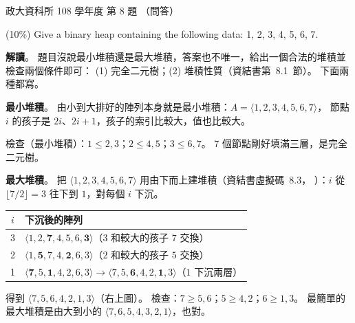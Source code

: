 \begin{pastexam}[label={px:nccu-108-dsa-08}]{政大資科所 108 學年度 第 8 題}
（問答）

(10\%) Give a binary heap containing the following data: 1, 2, 3, 4, 5, 6, 7.
\end{pastexam}

\begin{pastsoln}
\textbf{解讀}。 題目沒說最小堆積還是最大堆積，答案也不唯一，給出一個合法的堆積並檢查兩個條件即可：
(1) 完全二元樹；(2) 堆積性質（資結書第~8.1~節）。 下面兩種都寫。

\textbf{最小堆積}。 由小到大排好的陣列本身就是最小堆積：$A = \langle 1, 2, 3, 4, 5, 6, 7 \rangle$，
節點 $i$ 的孩子是 $2i$、$2i + 1$，孩子的索引比較大，值也比較大。
\begin{center}
\end{center}
檢查（最小堆積）：$1 \le 2, 3$；$2 \le 4, 5$；$3 \le 6, 7$。 $7$ 個節點剛好填滿三層，是完全二元樹。

\textbf{最大堆積}。 把 $\langle 1, 2, 3, 4, 5, 6, 7 \rangle$ 用由下而上建堆積（資結書虛擬碼~8.3，
）：$i$ 從 $\lfloor 7/2 \rfloor = 3$ 往下到 $1$，對每個 $i$ 下沉。
\begin{center}
\begin{tabular}{cl}
\toprule
$i$ & 下沉後的陣列 \\
\midrule
3 & $\langle 1, 2, \mathbf{7}, 4, 5, 6, \mathbf{3} \rangle$（$3$ 和較大的孩子 $7$ 交換） \\
2 & $\langle 1, \mathbf{5}, 7, 4, \mathbf{2}, 6, 3 \rangle$（$2$ 和較大的孩子 $5$ 交換） \\
1 & $\langle \mathbf{7}, 5, \mathbf{1}, 4, 2, 6, 3 \rangle \to \langle 7, 5, \mathbf{6}, 4, 2, \mathbf{1}, 3 \rangle$（$1$ 下沉兩層） \\
\bottomrule
\end{tabular}
\end{center}
得到 $\langle 7, 5, 6, 4, 2, 1, 3 \rangle$（右上圖）。 檢查：$7 \ge 5, 6$；$5 \ge 4, 2$；$6 \ge 1, 3$。
最簡單的最大堆積是由大到小的 $\langle 7, 6, 5, 4, 3, 2, 1 \rangle$，也對。


\end{pastsoln}
